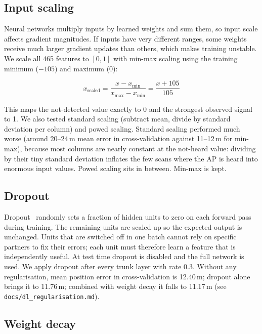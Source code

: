 \documentclass[conference]{IEEEtran}
\begin{document}
\subsection{Input scaling}

Neural networks multiply inputs by learned weights and sum them, so input scale affects gradient
magnitudes. If inputs have very different ranges, some weights receive much larger gradient
updates than others, which makes training unstable. We scale all 465 features to $[0,1]$ with
min-max scaling using the training minimum ($-105$) and maximum ($0$):

\begin{equation}
  x_{\text{scaled}} = \frac{x - x_{\min}}{x_{\max} - x_{\min}}
  = \frac{x + 105}{105}
\end{equation}

This maps the not-detected value exactly to 0 and the strongest observed signal to 1. We also
tested standard scaling (subtract mean, divide by standard deviation per column) and powed scaling.
Standard scaling performed much worse (around 20--24\,m mean error in cross-validation against
11--12\,m for min-max), because most columns are nearly constant at the not-heard value: dividing
by their tiny standard deviation inflates the few scans where the AP is heard into enormous input
values. Powed scaling sits in between. Min-max is kept.

\subsection{Dropout}

Dropout~\cite{srivastava2014dropout} randomly sets a fraction of hidden units to zero on each
forward pass during training. The remaining units are scaled up so the expected output is
unchanged. Units that are switched off in one batch cannot rely on specific partners to fix their
errors; each unit must therefore learn a feature that is independently useful. At test time
dropout is disabled and the full network is used. We apply dropout after every trunk layer with
rate 0.3. Without any regularisation, mean position error in cross-validation is 12.40\,m; dropout
alone brings it to 11.76\,m; combined with weight decay it falls to 11.17\,m
(see \texttt{docs/dl\_regularisation.md}).

\subsection{Weight decay}
\end{document}
